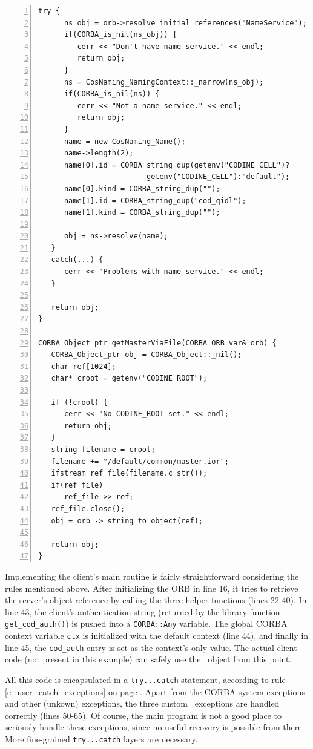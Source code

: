 \begin{Verbatim}[frame=lines, numbers=left, fontsize=\small, framerule=1mm]
   try {
      ns_obj = orb->resolve_initial_references("NameService");
      if(CORBA_is_nil(ns_obj)) {
         cerr << "Don't have name service." << endl;
         return obj;
      }
      ns = CosNaming_NamingContext::_narrow(ns_obj);
      if(CORBA_is_nil(ns)) {
         cerr << "Not a name service." << endl;
         return obj;
      }
      name = new CosNaming_Name();
      name->length(2);
      name[0].id = CORBA_string_dup(getenv("CODINE_CELL")?
                         getenv("CODINE_CELL"):"default");
      name[0].kind = CORBA_string_dup("");
      name[1].id = CORBA_string_dup("cod_qidl");
      name[1].kind = CORBA_string_dup("");
   
      obj = ns->resolve(name);
   }
   catch(...) {
      cerr << "Problems with name service." << endl;
   }

   return obj;
}

CORBA_Object_ptr getMasterViaFile(CORBA_ORB_var& orb) {
   CORBA_Object_ptr obj = CORBA_Object::_nil();
   char ref[1024];
   char* croot = getenv("CODINE_ROOT");
   
   if (!croot) {
      cerr << "No CODINE_ROOT set." << endl;
      return obj;
   }
   string filename = croot;
   filename += "/default/common/master.ior";
   ifstream ref_file(filename.c_str());
   if(ref_file) 
      ref_file >> ref;
   ref_file.close();
   obj = orb -> string_to_object(ref);

   return obj;
}
\end{Verbatim}

Implementing the client's main routine is fairly straightforward considering
the rules mentioned above. After initializing the ORB in line 16, it tries to
retrieve the server's object reference by calling the three helper functions
(lines 22-40). In line 43, the client's authentication string (returned by
the library function \texttt{get\_cod\_auth()}) is pushed into a
\texttt{CORBA::Any} variable. The global CORBA context variable \texttt{ctx}
is initialized with the default context (line 44), and finally in line 45, the
\texttt{cod\_auth} entry is set as the context's only value. The actual
client code (not present in this example) can safely  use the \master\ object 
from this point.

All this code is encapsulated in a \texttt{try...catch} statement, according
to rule \ref{e_user_catch_exceptions} on page
\pageref{e_user_catch_exceptions}. Apart from the CORBA system exceptions and
other (unkown) exceptions, the three custom \qidl\ exceptions are handled
correctly (lines 50-65). Of course, the main program is not a good place to
seriously handle these exceptions, since no useful recovery is possible from
there. More fine-grained \texttt{try...catch} layers are necessary.

